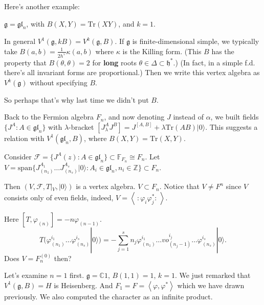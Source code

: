 \medskip{}

Here's another example:

\begin{example}
\label{example-fermions-are-universal-vertex-algebra}
$\mathfrak{g}=\mathfrak{gl}_n$, with $B(X,Y)=\text{Tr}(XY)$,
and $k=1$.
\end{example}

\begin{remark}
\label{remark-rescaling-the-Killing-form-and-Coxeter-number}
In general $V^1(\mathfrak{g},kB)=V^k(\mathfrak{g},B)$.
If $\mathfrak{g}$ is finite-dimensional simple, we 
typically take $B(a,b)=\frac{1}{2 h^\vee}\kappa(a,b)$ 
where $\kappa$ is the Killing form. (This $B$ 
has the property that $B(\theta,\theta)=2$
for {\bf long} roots $\theta \in \Delta \subset \mathfrak{h}^*$.)
(In fact, in a simple f.d. there's
all invariant forms are proportional.)
Then we write this vertex algebra
as $V^k(\mathfrak{g})$ without specifying $B$.
\end{remark}

So perhaps that's why last time we didn't put $B$.

\medskip\noindent
Back to the Fermion algebra $F_n$, and now
denoting $J$ instead of $\alpha$,
we built fields
$\{J^A:A \in \mathfrak{gl}_n\}$ with $\lambda$-bracket
$[J^A_\lambda J^B]=J^{[A,B]}+\lambda\text{Tr}(AB)|0\rangle$.
This suggests a relation with $V^1(\mathfrak{gl}_n,B)$,
where $B(X,Y)=\text{Tr}(X,Y)$.

Consider $\mathcal{F}=\{J^A(z):A \in \mathfrak{gl}_n\}\subset \mathbb{F}_{F_n}
\cong F_n$.
Let $V=\text{span}\{J^{A_1}_{(n_1)}\ldots J^{A_s}_{(n_s)}|0\rangle:
A_i \in \mathfrak{gl}_n,n_i \in \mathbb{Z}\}\subset F_n$.

Then $(V,\mathcal{F},T|_{V},|0\rangle)$ is a vertex algebra.
$V \subset F_n$. Notice that $V \neq F^n$
since $V$ consists only of even fields,
indeed, $V=\left<\,:\!\varphi_i \varphi_j^*\!:\,\right>$.

Here $[T,\varphi_{(n)}]=-n\varphi_{(n-1)}$.
$$
T(\varphi^{i_1}_{(n_1)}\ldots\varphi^{i_s}_{(n_s)}|0\rangle)
=-\sum_{j=1}^s n_j\varphi_{(n_1)}^{i_1}
\ldots vo_{(n_j-1)}^{i_j}\ldots
\varphi_{(n_s)}^{i_s}|0\rangle.
$$
Does $V=F^{(0)}_n$ then?

Let's examine $n=1$ first. $\mathfrak{g}=\mathbb{C}1$,
$B(1,1)=1$, $k=1$. We just remarked
that $V^1(\mathfrak{g},B)=H$ is 
Heisenberg. And $F_1=F=\left<\varphi,\varphi^*\right>$ 
which we have drawn previously.
We also computed
the character as an infinite product.

